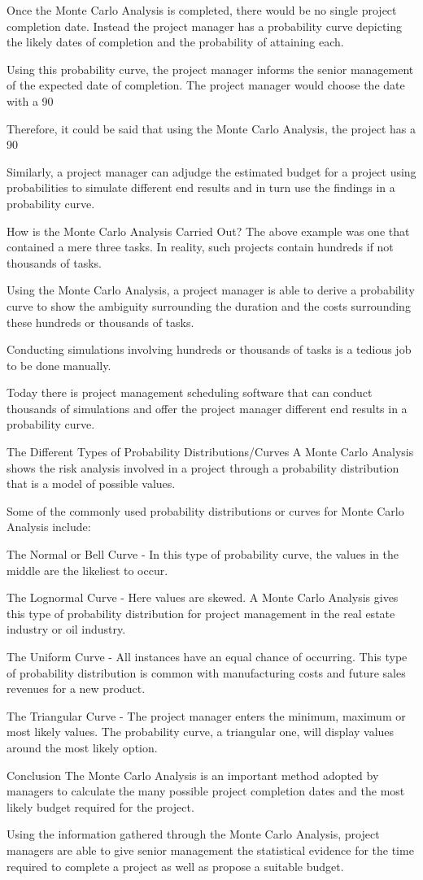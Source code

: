 Once the Monte Carlo Analysis is completed, there would be no single project completion date. Instead the project manager has a probability curve depicting the likely dates of completion and the probability of attaining each.

Using this probability curve, the project manager informs the senior management of the expected date of completion. The project manager would choose the date with a 90%

Therefore, it could be said that using the Monte Carlo Analysis, the project has a 90%

Similarly, a project manager can adjudge the estimated budget for a project using probabilities to simulate different end results and in turn use the findings in a probability curve.

How is the Monte Carlo Analysis Carried Out?
The above example was one that contained a mere three tasks. In reality, such projects contain hundreds if not thousands of tasks.

Using the Monte Carlo Analysis, a project manager is able to derive a probability curve to show the ambiguity surrounding the duration and the costs surrounding these hundreds or thousands of tasks.

Conducting simulations involving hundreds or thousands of tasks is a tedious job to be done manually.

Today there is project management scheduling software that can conduct thousands of simulations and offer the project manager different end results in a probability curve.

The Different Types of Probability Distributions/Curves
A Monte Carlo Analysis shows the risk analysis involved in a project through a probability distribution that is a model of possible values.

Some of the commonly used probability distributions or curves for Monte Carlo Analysis include:

The Normal or Bell Curve - In this type of probability curve, the values in the middle are the likeliest to occur.

The Lognormal Curve - Here values are skewed. A Monte Carlo Analysis gives this type of probability distribution for project management in the real estate industry or oil industry.

The Uniform Curve - All instances have an equal chance of occurring. This type of probability distribution is common with manufacturing costs and future sales revenues for a new product.

The Triangular Curve - The project manager enters the minimum, maximum or most likely values. The probability curve, a triangular one, will display values around the most likely option.

Conclusion
The Monte Carlo Analysis is an important method adopted by managers to calculate the many possible project completion dates and the most likely budget required for the project.

Using the information gathered through the Monte Carlo Analysis, project managers are able to give senior management the statistical evidence for the time required to complete a project as well as propose a suitable budget.
